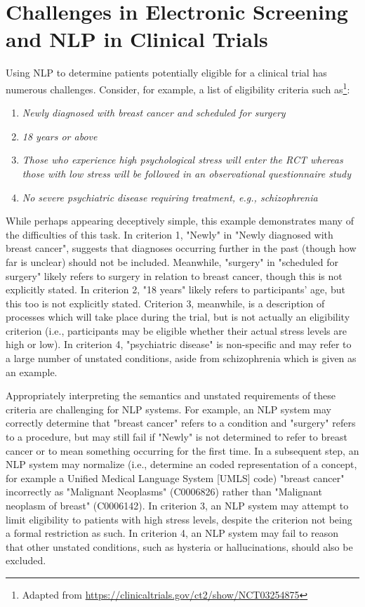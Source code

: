 \documentclass[../main.tex]{subfiles}
\begin{document}
\section{Challenges in Electronic Screening and NLP in Clinical Trials}

Using NLP to determine patients potentially eligible for a clinical trial has numerous challenges. Consider, for example, a list of eligibility criteria such as\footnote{Adapted from  \url{https://clinicaltrials.gov/ct2/show/NCT03254875}}:

\begin{enumerate}
    \itemsep0em 
    \item \textit{Newly diagnosed with breast cancer and scheduled for surgery}
    \item \textit{18 years or above}
    \item \textit{Those who experience high psychological stress will enter the RCT whereas those with low stress will be followed in an observational questionnaire study}
    \item \textit{No severe psychiatric disease requiring treatment, e.g., schizophrenia}
\end{enumerate}

\noindent While perhaps appearing deceptively simple, this example demonstrates many of the difficulties of this task. In criterion 1,  "Newly" in "Newly diagnosed with breast cancer", suggests that diagnoses occurring further in the past (though how far is unclear) should not be included. Meanwhile, "surgery" in "scheduled for surgery" likely refers to surgery in relation to breast cancer, though this is not explicitly stated. In criterion 2, "18 years" likely refers to participants' age, but this too is not explicitly stated. Criterion 3, meanwhile, is a description of processes which will take place during the trial, but is not actually an eligibility criterion (i.e., participants may be eligible whether their actual stress levels are high or low). In criterion 4, "psychiatric disease" is non-specific and may refer to a large number of unstated conditions, aside from schizophrenia which is given as an example.

Appropriately interpreting the semantics and unstated requirements of these criteria are challenging for NLP systems. For example, an NLP system may correctly determine that "breast cancer" refers to a condition and "surgery" refers to a procedure, but may still fail if "Newly" is not determined to refer to breast cancer or to mean something occurring for the first time. In a subsequent step, an NLP system may normalize (i.e., determine an coded representation of a concept, for example a Unified Medical Language System [UMLS] code) "breast cancer" incorrectly as "Malignant Neoplasms" (C0006826) rather than "Malignant neoplasm of breast" (C0006142). In criterion 3, an NLP system may attempt to limit eligibility to patients with high stress levels, despite the criterion not being a formal restriction as such. In criterion 4, an NLP system may fail to reason that other unstated conditions, such as hysteria or hallucinations, should also be excluded.
\end{document}
